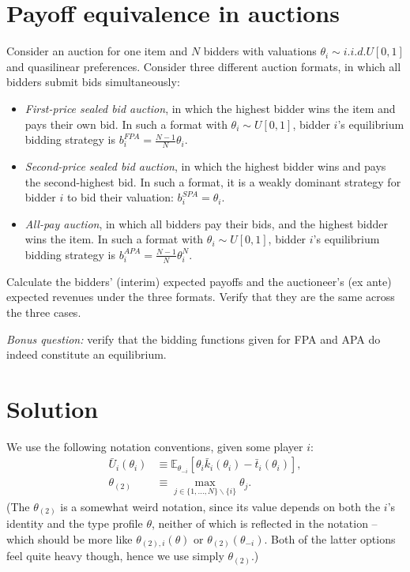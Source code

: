\documentclass[a4paper]{article}
\newif\ifsolutions
\begin{document}
\fi



\section{Payoff equivalence in auctions}

Consider an auction for one item and $N$ bidders with valuations $\theta_i \sim i.i.d.U[0,1]$ and quasilinear preferences. Consider three different auction formats, in which all bidders submit bids simultaneously:
\begin{itemize}
	\item \emph{First-price sealed bid auction}, in which the highest bidder wins the item and pays their own bid. In such a format with $\theta_i \sim U[0,1]$, bidder $i$'s equilibrium bidding strategy is $b_i^{FPA} = \frac{N-1}{N} \theta_i$.
	\item \emph{Second-price sealed bid auction}, in which the highest bidder wins and pays the second-highest bid. In such a format, it is a weakly dominant strategy for bidder $i$ to bid their valuation: $b_i^{SPA} = \theta_i$.
	\item \emph{All-pay auction}, in which all bidders pay their bids, and the highest bidder wins the item. In such a format with $\theta_i \sim U[0,1]$, bidder $i$'s equilibrium bidding strategy is $b_i^{APA} = \frac{N-1}{N} \theta_i^N$.
\end{itemize}
Calculate the bidders' (interim) expected payoffs and the auctioneer's (ex ante) expected revenues under the three formats. Verify that they are the same across the three cases.

\emph{Bonus question:} verify that the bidding functions given for FPA and APA do indeed constitute an equilibrium.

\ifsolutions
\section*{Solution}

We use the following notation conventions, given some player $i$:
\begin{align*}
	\bar{U}_i(\theta_i) &\equiv \mathbb{E}_{\theta_{-i}} \left[ \theta_i \bar{k}_i(\theta_i) - \bar{t}_i(\theta_i) \right],
	\\
	\theta_{(2)} &\equiv \max_{j \in \{1,...,N\} \backslash \{i\}} \theta_j .
\end{align*}
(The $\theta_{(2)}$ is a somewhat weird notation, since its value depends on both the $i$'s identity and the type profile $\theta$, neither of which is reflected in the notation -- which should be more like $\theta_{(2),i}(\theta)$ or $\theta_{(2)}(\theta_{-i})$. Both of the latter options feel quite heavy though, hence we use simply $\theta_{(2)}$.)
\end{document}
